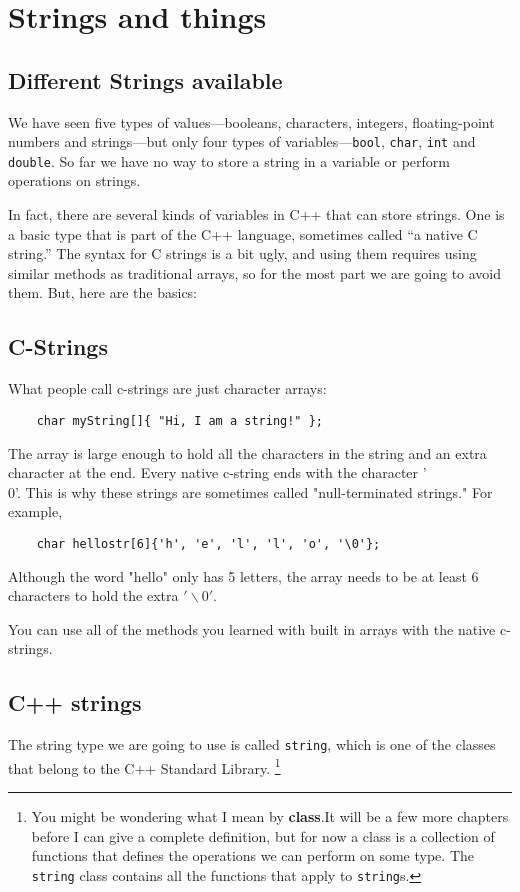 


\chapter{Strings and things}
\label{strings}

\section{Different Strings available}

We have seen five types of values---booleans, characters, integers,
floating-point numbers and strings---but only four types of
variables---{\tt bool}, {\tt char}, {\tt int} and {\tt double}.  So
far we have no way to store a string in a variable or perform
operations on strings.

In fact, there are several kinds of variables in C++ that
can store strings.  One is a basic type that is part of the C++
language, sometimes called ``a native C string.''  The syntax
for C strings is a bit ugly, and using them requires using similar
methods as traditional arrays, so for the most part we are going to
avoid them. But, here are the basics:
\section{C-Strings}
What people call c-strings are just character arrays:
\begin{verbatim}
    char myString[]{ "Hi, I am a string!" };
\end{verbatim}
The array is large enough to hold all the characters in the string and an extra
character at the end. Every native c-string ends with the character '\\0'. This
is why these strings are sometimes called "null-terminated strings." For example,
\begin{verbatim}
    char hellostr[6]{'h', 'e', 'l', 'l', 'o', '\0'};
\end{verbatim}
Although the word "hello" only has 5 letters, the array needs to be at least 6 characters
to hold the extra $'\backslash 0'$.

You can
use all of the methods you learned with built in arrays with the native c-strings.
\section{C++ strings}
The string type we are going to use is called {\tt string}, which is
one of the classes that belong to the C++ Standard Library.
\footnote{You might be wondering what I mean by {\bf class}.It will be a few
more chapters before I can give a complete definition, but for now a
class is a collection of functions that defines the operations we
can perform on some type.  The {\tt string} class contains all
the functions that apply to {\tt string}s.}


